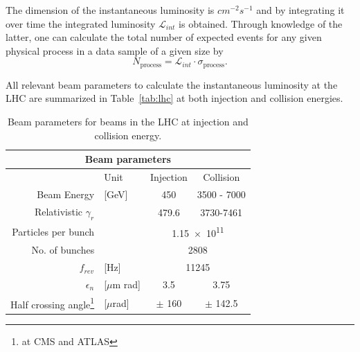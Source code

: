The dimension of the instantaneous luminosity is $cm^{-2}s^{-1}$ and by integrating it over time
the integrated luminosity $\mathcal{L}_{int}$ is obtained. Through knowledge of the latter, one can calculate the total number
of expected events for any given physical process in a data sample of a given size by
\begin{equation}
    N_{\text{process}} = \mathcal{L}_{int} \cdot \sigma_{\text{process}}.
\end{equation}

All relevant beam parameters to calculate the instantaneous luminosity at the LHC are summarized in Table~\ref{tab:lhc}
at both injection and collision energies. 

\begin{table}
    \begin{center}
    \caption{Beam parameters for beams in the LHC at injection and collision energy.}
    \label{tab:lhc}
    \begin{tabular}{ r l | c | c }
    \multicolumn{4}{c}{\textbf{Beam parameters}} \\                                                                                            \hline
                                                                & Unit         & Injection                                    & Collision \\   \hline \hline
    Beam Energy                                                 & [GeV]        & 450                                          & 3500 - 7000 \\ \hline
    Relativistic $\gamma_r$                                     &              & 479.6                                        & 3730-7461  \\  \hline
    Particles per bunch                                         &              & \multicolumn{2}{c}{\num{1.15e11}} \\                          \hline
    No. of bunches                                              &              & \multicolumn{2}{c}{2808} \\                                   \hline
    $f_{rev}$                                                   & [Hz]         & \multicolumn{2}{c}{11245}                            \\       \hline
    $\epsilon_n$                                                & [$\mu$m rad] & 3.5                                          & 3.75 \\        \hline
    Half crossing angle\footnote{\label{note1}at CMS and ATLAS} & [$\mu$rad]   & $\pm$ 160                                    & $\pm$ 142.5 \\ \hline

\end{tabular}
\end{center}
\end{table}
